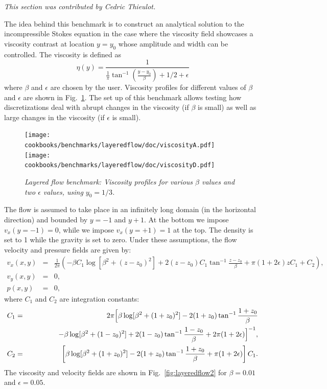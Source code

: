 \documentclass{article}
\begin{document}
\textit{This section was contributed by Cedric Thieulot.}

The idea behind this benchmark is to construct an analytical solution to the incompressible
Stokes equation in the case where the viscosity field showcases a
viscosity contrast at location $y=y_0$ whose amplitude and width can be controlled.
The viscosity is defined as
\[
\eta(y)=\frac{1}{\frac{1}{\pi} \tan^{-1} (\frac{y-y_0}{\beta} ) + 1/2 + \epsilon}
\]
where $\beta$ and $\epsilon$ are chosen by the user.
Viscosity profiles for different values of $\beta$ and $\epsilon$ are
shown in Fig.~\ref{fig:layeredflow1}. The set up of this benchmark
allows testing how discretizations deal with abrupt changes in the
viscosity (if $\beta$ is small) as well as large changes in the
viscosity (if $\epsilon$ is small).

\begin{figure}
\begin{center}
  \centering
  \texttt{[image: cookbooks/benchmarks/layeredflow/doc/viscosityA.pdf]}
  \texttt{[image: cookbooks/benchmarks/layeredflow/doc/viscosityD.pdf]}
  \caption{\it Layered flow benchmark: Viscosity profiles for various
    $\beta$ values and two $\epsilon$ values, using $y_0=1/3$.}
  \label{fig:layeredflow1}
\end{center}
\end{figure}

The flow is assumed to take place in an infinitely long domain (in the horizontal direction)
and bounded by $y=-1$ and $y+1$.
At the bottom we impose $v_x(y=-1)=0$, while we impose $v_x(y=+1)=1$ at the top.
The density is set to 1 while the gravity is set to zero.
Under these assumptions, the flow velocity and pressure fields are given by:
\begin{eqnarray}
v_x(x,y)&=&\frac{1}{2\pi} \left(  -\beta C_1 \log [\beta^2 + (z-z_0)^2]  + 2 (z-z_0)  C_1 \tan^{-1} \frac{z-z_0}{\beta} + \pi (1+2\epsilon) z C_1  + C_2 \right), \nonumber\\
v_y(x,y) &=& 0, \nonumber\\
p(x,y) &=& 0,
\end{eqnarray}
where $C_1$ and $C_2$ are integration constants:
\begin{eqnarray*}
C_1 &=& 2\pi \Bigl[
 \beta  \log [\beta^2 + (1+z_0)^2]  -  2(1+z_0) \tan^{-1}
 \frac{1+z_0}{\beta}
 \\
 &&\qquad\qquad
-\beta  \log [\beta^2 + (1-z_0)^2]  +  2(1-z_0) \tan^{-1} \frac{1-z_0}{\beta} + 2\pi (1+2\epsilon)   \Bigr]^{-1},\\
C_2 &=& \left[ \beta  \log [\beta^2 + (1+z_0)^2]  -  2(1+z_0) \tan^{-1} \frac{1+z_0}{\beta} + \pi(1+2\epsilon) \right]C_1.
\end{eqnarray*}
The viscosity and velocity fields are shown in Fig.~\ref{fig:layeredflow2} for $\beta=0.01$ and $\epsilon=0.05$.
\end{document}
